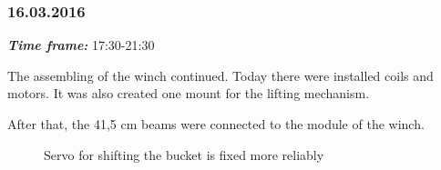 \subsubsection{16.03.2016}
\textit{\textbf{Time frame:}} 17:30-21:30 

The assembling of the winch continued. Today there were installed coils and motors. It was also created one mount for the lifting mechanism.

After that, the 41,5 cm beams were connected to the module of the winch.


\begin{figure}[H]
	\begin{minipage}[h]{1\linewidth}
		\caption{Servo for shifting the bucket is fixed more reliably}
		\label{Shiftbuc2.8}
	\end{minipage}
\end{figure}
